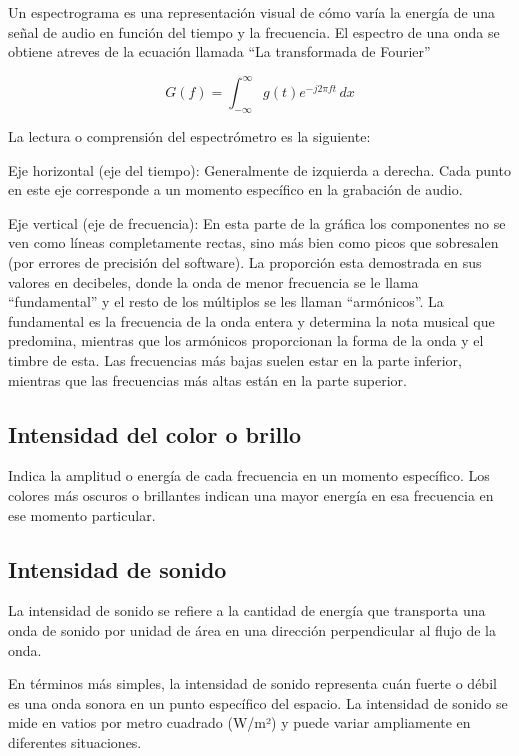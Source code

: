 \documentclass[letterpaper, 12pt]{article}
\begin{document}
Un espectrograma es una representación visual de cómo varía
la energía de una señal de audio en función del tiempo y la
frecuencia. El espectro de una onda se obtiene atreves de
la ecuación llamada ``La transformada de Fourier''

\begin{equation}
	G(f) = \int_{-\infty}^{\infty } g(t) e^{-j 2 \pi f t} \,dx
\end{equation}

La lectura o comprensión del espectrómetro es la siguiente:

Eje horizontal (eje del tiempo): Generalmente de izquierda
a derecha. Cada punto en este eje corresponde a un momento
específico en la grabación de audio.

Eje vertical (eje de frecuencia): En esta parte de la
gráfica los componentes no se ven como líneas completamente
rectas, sino más bien como picos que sobresalen (por
errores de precisión del software). La proporción esta
demostrada en sus valores en decibeles, donde la onda de
menor frecuencia se le llama “fundamental” y el resto de
los múltiplos se les llaman “armónicos”. La fundamental es
la frecuencia de la onda entera y determina la nota musical
que predomina, mientras que los armónicos proporcionan la
forma de la onda y el timbre de esta. Las frecuencias más
bajas suelen estar en la parte inferior, mientras que las
frecuencias más altas están en la parte superior.

\subsection*{Intensidad del color o brillo}

Indica la amplitud o energía de cada frecuencia en un
momento específico. Los colores más oscuros o brillantes
indican una mayor energía en esa frecuencia en ese momento
particular.

\subsection*{Intensidad de sonido}

La intensidad de sonido se refiere a la cantidad de energía
que transporta una onda de sonido por unidad de área en una
dirección perpendicular al flujo de la onda.

En términos más simples, la intensidad de sonido representa
cuán fuerte o débil es una onda sonora en un punto
específico del espacio. La intensidad de sonido se mide en
vatios por metro cuadrado (W/m²) y puede variar ampliamente
en diferentes situaciones.
\end{document}
